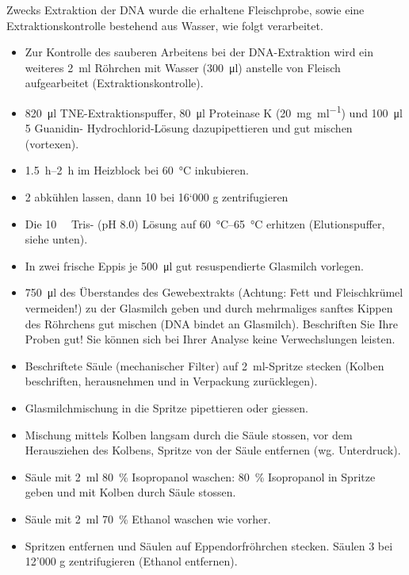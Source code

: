 \documentclass[a4paper,english]{scrreprt}
\begin{document}
Zwecks Extraktion der DNA wurde die erhaltene Fleischprobe, sowie eine
Extraktionskontrolle bestehend aus Wasser, wie folgt verarbeitet.

\begin{itemize}
	\item Zur Kontrolle des sauberen Arbeitens bei der DNA-Extraktion wird
		ein weiteres \SI{2}{\ml} Röhrchen mit Wasser (\SI{300}{\ul})
		anstelle von Fleisch aufgearbeitet (Extraktionskontrolle).
	\item \SI{820}{\ul} TNE-Extraktionspuffer, \SI{80}{\ul} Proteinase K
		(\SI{20}{\mg \per \ml}) und \SI{100}{\ul} \SI{5}{\Molar}
		Guanidin- Hydrochlorid-Lösung dazupipettieren und gut mischen
		(vortexen).
	\item \SIrange{1.5}{2}{\hour} im Heizblock bei \SI{60}{\celsius}
		inkubieren.
	\item \SI{2}{\min} abkühlen lassen, dann \SI{10}{\min} bei 16‘000 g
		zentrifugieren
	\item Die \SI{10}{\milli\Molar} Tris- (pH 8.0) Lösung auf
		\SIrange{60}{65}{\celsius} erhitzen (Elutionspuffer, siehe
		unten).
	\item In zwei frische Eppis je \SI{500}{\ul} gut resuspendierte
		Glasmilch vorlegen.
	\item \SI{750}{\ul} des Überstandes des Gewebextrakts (Achtung: Fett
		und Fleischkrümel vermeiden!) zu der Glasmilch geben und durch
		mehrmaliges sanftes Kippen des Röhrchens gut mischen (DNA
		bindet an Glasmilch). Beschriften Sie Ihre Proben gut! Sie
		können sich bei Ihrer Analyse keine Verwechslungen leisten.
	\item Beschriftete Säule (mechanischer Filter) auf \SI{2}{\ml}-Spritze
		stecken (Kolben beschriften, herausnehmen und in Verpackung
		zurücklegen).
	\item Glasmilchmischung in die Spritze pipettieren oder giessen.
	\item Mischung mittels Kolben langsam durch die Säule stossen, vor dem
		Herausziehen des Kolbens, Spritze von der Säule entfernen (wg.
		Unterdruck).
	\item Säule mit \SI{2}{\ml} \SI{80}{\percent} Isopropanol waschen:
		\SI{80}{\percent} Isopropanol in Spritze geben und mit Kolben
		durch Säule stossen.
	\item Säule mit \SI{2}{\ml} \SI{70}{\percent} Ethanol waschen wie
		vorher.
	\item Spritzen entfernen und Säulen auf Eppendorfröhrchen stecken.
		Säulen \SI{3}{\min} bei 12'000 g zentrifugieren (Ethanol
		entfernen).

\end{itemize}
\end{document}

